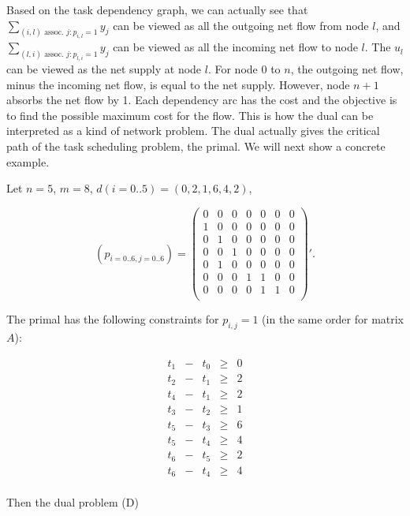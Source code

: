 Based on the task dependency graph, we can actually see that $\sum_{(i,l) \text{ assoc. } j:p_{i,l}=1} y_j$ can be viewed as all the outgoing net flow from node $l$, and $\sum_{(l,i) \text{ assoc. } j:p_{l,i}=1} y_j$ can be viewed as all the incoming net flow to node $l$. The $u_l$ can be viewed as the net supply at node $l$. For node $0$ to $n$, the outgoing net flow, minus the incoming net flow, is equal to the net supply. However, node $n+1$ absorbs the net flow by 1. Each dependency arc has the cost and the objective is to find the possible maximum cost for the flow. This is how the dual can be interpreted as a kind of network problem. The dual actually gives the critical path of the task scheduling problem, the primal. We will next show a concrete example.

Let $n=5$, $m=8$, $d(i=0..5)=(0,2,1,6,4,2)$, 

$$
(p_{i=0..6,j=0..6}) = \left(
  \begin{array}{ccccccc}
     0 & 0 & 0 & 0 & 0 & 0 & 0\\
	1 & 0 & 0 & 0 & 0 & 0 & 0\\
	0 & 1 & 0 & 0 & 0 & 0 & 0\\
	0 & 0 & 1 & 0 & 0 & 0 & 0\\
	0 & 1 & 0 & 0 & 0 & 0 & 0\\
	0 & 0 & 0 & 1 & 1 & 0 & 0\\
	0 & 0 & 0 & 0 & 1 & 1 & 0\\
  \end{array}
\right)'.
$$

The primal has the following constraints for $p_{i,j}=1$ (in the same order for matrix $A$):

\[
\begin{array}{ccccc}
	t_1 & - & t_0 & \geq & 0\\
	t_2 & - & t_1 & \geq & 2\\
	t_4 & - & t_1 & \geq & 2\\
	t_3 & - & t_2 & \geq & 1\\
	t_5 & - & t_3 & \geq & 6\\
	t_5 & - & t_4 & \geq & 4\\
	t_6 & - & t_5 & \geq & 2\\
	t_6 & - & t_4 & \geq & 4\\
\end{array}
\]

Then the dual problem (D) 

